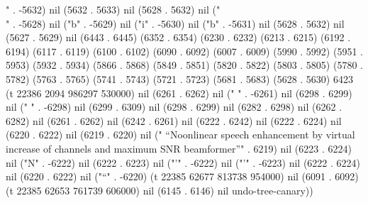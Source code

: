 " . -5632) nil (5632 . 5633) nil (5628 . 5632) nil ("\\" . -5628) nil ("b" . -5629) nil ("i" . -5630) nil ("b" . -5631) nil (5628 . 5632) nil (5627 . 5629) nil (6443 . 6445) (6352 . 6354) (6230 . 6232) (6213 . 6215) (6192 . 6194) (6117 . 6119) (6100 . 6102) (6090 . 6092) (6007 . 6009) (5990 . 5992) (5951 . 5953) (5932 . 5934) (5866 . 5868) (5849 . 5851) (5820 . 5822) (5803 . 5805) (5780 . 5782) (5763 . 5765) (5741 . 5743) (5721 . 5723) (5681 . 5683) (5628 . 5630) 6423 (t 22386 2094 986297 530000) nil (6261 . 6262) nil ("
" . -6261) nil (6298 . 6299) nil ("
" . -6298) nil (6299 . 6309) nil (6298 . 6299) nil (6282 . 6298) nil (6262 . 6282) nil (6261 . 6262) nil (6242 . 6261) nil (6222 . 6242) nil (6222 . 6224) nil (6220 . 6222) nil (6219 . 6220) nil (" ``Noonlinear speech enhancement by virtual increase of channels and maximum SNR beamformer”" . 6219) nil (6223 . 6224) nil ("N" . -6222) nil (6222 . 6223) nil ("'" . -6222) nil ("'" . -6223) nil (6222 . 6224) nil (6220 . 6222) nil ("“" . -6220) (t 22385 62677 813738 954000) nil (6091 . 6092) (t 22385 62653 761739 606000) nil (6145 . 6146) nil undo-tree-canary))

